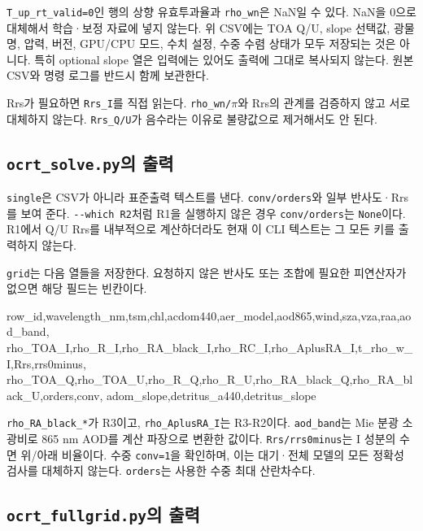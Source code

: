 \texttt{T\_\allowbreak{}up\_\allowbreak{}rt\_\allowbreak{}valid=\allowbreak{}0}인 행의 상향 유효투과율과 \texttt{rho\_\allowbreak{}wn}은 NaN일 수 있다. NaN을 0으로 대체해서 학습·보정 자료에 넣지 않는다. 위 CSV에는 TOA Q/U, slope 선택값, 광물명, 압력, 버전, GPU/CPU 모드, 수치 설정, 수중 수렴 상태가 모두 저장되는 것은 아니다. 특히 optional slope 열은 입력에는 있어도 출력에 그대로 복사되지 않는다. 원본 CSV와 명령 로그를 반드시 함께 보관한다.

Rrs가 필요하면 \texttt{Rrs\_\allowbreak{}I}를 직접 읽는다. \texttt{rho\_\allowbreak{}wn/\allowbreak{}\ensuremath{\pi}}와 Rrs의 관계를 검증하지 않고 서로 대체하지 않는다. \texttt{Rrs\_\allowbreak{}Q/\allowbreak{}U}가 음수라는 이유로 불량값으로 제거해서도 안 된다.

\subsection{\texttt{ocrt\_\allowbreak{}solve.\allowbreak{}py}의 출력}
\label{sec:auto:06_python_batch:8.2}
\texttt{single}은 CSV가 아니라 표준출력 텍스트를 낸다. \texttt{conv/\allowbreak{}orders}와 일부 반사도·Rrs를 보여 준다. \texttt{-\allowbreak{}-\allowbreak{}which R2}처럼 R1을 실행하지 않은 경우 \texttt{conv/\allowbreak{}orders}는 \texttt{None}이다. R1에서 Q/U Rrs를 내부적으로 계산하더라도 현재 이 CLI 텍스트는 그 모든 키를 출력하지 않는다.

\texttt{grid}는 다음 열들을 저장한다. 요청하지 않은 반사도 또는 조합에 필요한 피연산자가 없으면 해당 필드는 빈칸이다.


\begin{ManualCode}
row_id,wavelength_nm,tsm,chl,acdom440,aer_model,aod865,wind,sza,vza,raa,aod_band,
rho_TOA_I,rho_R_I,rho_RA_black_I,rho_RC_I,rho_AplusRA_I,t_rho_w_I,Rrs,rrs0minus,
rho_TOA_Q,rho_TOA_U,rho_R_Q,rho_R_U,rho_RA_black_Q,rho_RA_black_U,orders,conv,
adom_slope,detritus_a440,detritus_slope
\end{ManualCode}

\texttt{rho\_\allowbreak{}RA\_\allowbreak{}black\_\allowbreak{}*}가 R3이고, \texttt{rho\_\allowbreak{}AplusRA\_\allowbreak{}I}는 R3-R2이다. \texttt{aod\_\allowbreak{}band}는 Mie 분광 소광비로 865 nm AOD를 계산 파장으로 변환한 값이다. \texttt{Rrs/\allowbreak{}rrs0minus}는 I 성분의 수면 위/아래 비율이다. 수중 \texttt{conv=\allowbreak{}1}을 확인하며, 이는 대기·전체 모델의 모든 정확성 검사를 대체하지 않는다. \texttt{orders}는 사용한 수중 최대 산란차수다.

\subsection{\texttt{ocrt\_\allowbreak{}fullgrid.\allowbreak{}py}의 출력}
\label{sec:auto:06_python_batch:8.3}

